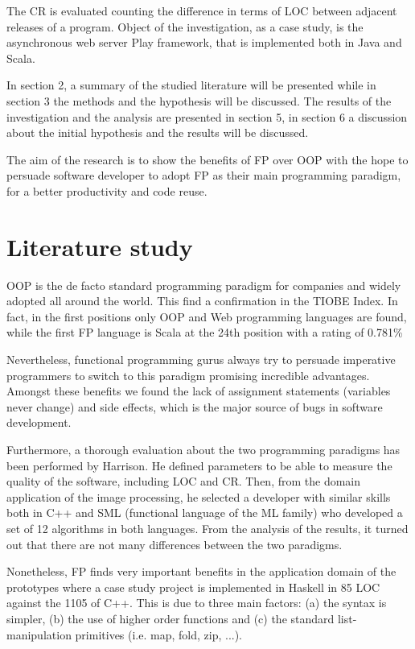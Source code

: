 \documentclass{article}
\begin{document}
The CR is evaluated counting the difference in terms of LOC between adjacent releases of a program. Object of the investigation, as a case study, is the asynchronous web server Play framework\cite{play}, that is implemented both in Java and Scala.

In section 2, a summary of the studied literature will be presented while in section 3 the methods and the hypothesis will be discussed. The results of the investigation and the analysis are presented in section 5, in section 6 a discussion about the initial hypothesis and the results will be discussed.

The aim of the research is to show the benefits of FP over OOP with the hope to persuade software developer to adopt FP as their main programming paradigm, for a better productivity and code reuse. 

\section{Literature study}

OOP is the de facto standard programming paradigm for companies and widely adopted all around the world. This find a confirmation in the TIOBE Index\cite{tiobe}. In fact, in the first positions only OOP and Web programming languages are found, while the first FP language is Scala at the 24th position with a rating of 0.781\%

Nevertheless, functional programming gurus always try to persuade imperative programmers to switch to this paradigm promising incredible advantages. Amongst these benefits we found the lack of assignment statements (variables never change) and side effects, which is the major source of bugs in software development\cite{fpmatter}.

Furthermore, a thorough evaluation about the two programming paradigms has been performed by Harrison\cite{harrison}. He defined parameters to be able to measure the quality of the software, including LOC and CR. Then, from the domain application of the image processing, he selected a developer with similar skills both in C++ and SML (functional language of the ML family) who developed a set of 12 algorithms in both languages. From the analysis of the results, it turned out that there are not many differences between the two paradigms.

Nonetheless, FP finds very important benefits in the application domain of the prototypes where a case study project is implemented in Haskell in 85 LOC against the 1105 of C++\cite{Haskell-vs-ada}. This is due to three main factors: (a) the syntax is simpler, (b) the use of higher order functions and (c) the standard list-manipulation primitives (i.e. map, fold, zip, ...).
\end{document}
